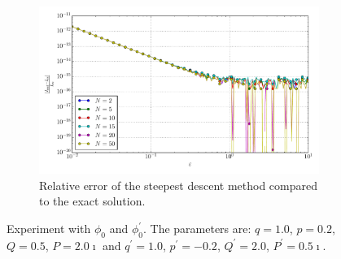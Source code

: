 \documentclass[a4paper,10pt]{article}
\begin{document}
\begin{figure}[ht!]
\begin{subfigure}[t]{0.5\linewidth}
    \includegraphics[width=\linewidth]{./plots/tp_1d_conv_eps_0_0_err_rel_nsd.pdf}
    \caption{Relative error of the steepest descent method compared to the exact solution.}
    \label{fig:tp_1d_conv_eps_0_0_err_nsd}
  \end{subfigure}
  \label{fig:tp_1d_conv_eps_0_0}
  \caption{Experiment with $\phi_{0}$ and $\phi_{0}^{\prime}$.
  The parameters are:
  $q=1.0$, $p=0.2$, $Q=0.5$, $P=2.0\imath$ and
  $q^\prime=1.0$, $p^\prime=-0.2$, $Q^\prime=2.0$, $P^\prime=0.5\imath$.}
\end{figure}
\end{document}
